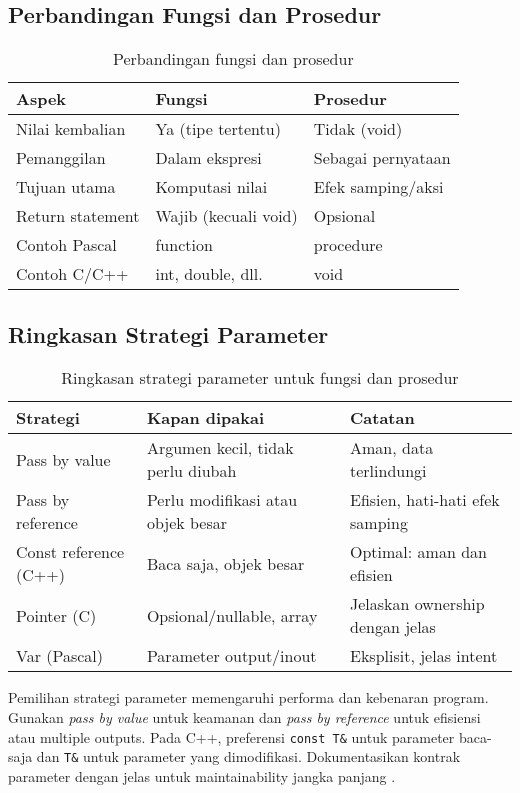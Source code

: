 \documentclass[../main.tex]{subfiles}
\begin{document}
\subsection{Perbandingan Fungsi dan Prosedur}
\begin{table}[H]
  \centering
  \caption{Perbandingan fungsi dan prosedur}
  \begin{tabular}{@{}lll@{}}
    \toprule
    Aspek & Fungsi & Prosedur \\
    \midrule
    Nilai kembalian & Ya (tipe tertentu) & Tidak (void) \\
    Pemanggilan & Dalam ekspresi & Sebagai pernyataan \\
    Tujuan utama & Komputasi nilai & Efek samping/aksi \\
    Return statement & Wajib (kecuali void) & Opsional \\
    Contoh Pascal & function & procedure \\
    Contoh C/C++ & int, double, dll. & void \\
    \bottomrule
  \end{tabular}
\end{table}

\subsection{Ringkasan Strategi Parameter}
\begin{table}[H]
  \centering
  \caption{Ringkasan strategi parameter untuk fungsi dan prosedur}
  \small
  \begin{tabular}{@{}p{4cm}p{5cm}p{4.5cm}@{}}
    \toprule
    Strategi & Kapan dipakai & Catatan \\
    \midrule
    Pass by value & Argumen kecil, tidak perlu diubah & Aman, data terlindungi \\
    Pass by reference & Perlu modifikasi atau objek besar & Efisien, hati-hati efek samping \\
    Const reference (C++) & Baca saja, objek besar & Optimal: aman dan efisien \\
    Pointer (C) & Opsional/nullable, array & Jelaskan ownership dengan jelas \\
    Var (Pascal) & Parameter output/inout & Eksplisit, jelas intent \\
    \bottomrule
  \end{tabular}
\end{table}

Pemilihan strategi parameter memengaruhi performa dan kebenaran program. Gunakan \emph{pass by value} untuk keamanan dan \emph{pass by reference} untuk efisiensi atau multiple outputs. Pada C++, preferensi \texttt{const T\&} untuk parameter baca-saja dan \texttt{T\&} untuk parameter yang dimodifikasi. Dokumentasikan kontrak parameter dengan jelas untuk maintainability jangka panjang \parencite{cpp-functions,gnu-c-manual,free-pascal-docs}.
\end{document}
